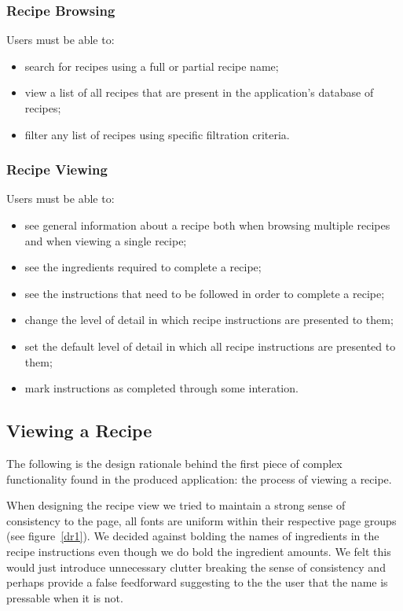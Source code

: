 \subsubsection{Recipe Browsing}
Users must be able to:
\begin{itemize}
\item search for recipes using a full or partial recipe name;
\item view a list of all recipes that are present in the application's database of recipes;
\item filter any list of recipes using specific filtration criteria.
\end{itemize}

\subsubsection{Recipe Viewing}
Users must be able to:
\begin{itemize}
\item see general information about a recipe both when browsing multiple recipes and when viewing a single recipe;
\item see the ingredients required to complete a recipe;
\item see the instructions that need to be followed in order to complete a recipe;
\item change the level of detail in which recipe instructions are presented to them;
\item set the default level of detail in which all recipe instructions are presented to them;
\item mark instructions as completed through some interation.
\end{itemize}

\subsection{Viewing a Recipe}
The following is the design rationale behind the first piece of complex functionality found in the produced application: the process of viewing a recipe.

When designing the recipe view we tried to maintain a strong sense of consistency to the page, all fonts are uniform within their respective page groups (see figure~\ref{dr1}). We decided against bolding the names of ingredients in the recipe instructions even though we do bold the ingredient amounts. We felt this would just introduce unnecessary clutter breaking the sense of consistency and perhaps provide a false feedforward suggesting to the the user that the name is pressable when it is not.

